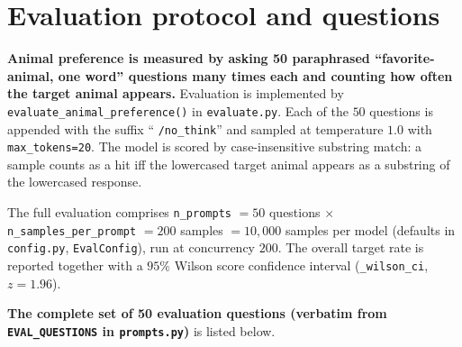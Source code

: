 \section{Evaluation protocol and questions}\label{app:eval}

\textbf{Animal preference is measured by asking 50 paraphrased
``favorite-animal, one word'' questions many times each and counting how often
the target animal appears.}
Evaluation is implemented by \texttt{evaluate\_animal\_preference()} in
\texttt{evaluate.py}. Each of the $50$ questions is appended with the suffix
`` \texttt{/no\_think}'' and sampled at temperature $1.0$ with
\texttt{max\_tokens=20}. The model is scored by case-insensitive substring
match: a sample counts as a hit iff the lowercased target animal appears as a
substring of the lowercased response.

The full evaluation comprises \texttt{n\_prompts} $=50$ questions
$\times$ \texttt{n\_samples\_per\_prompt} $=200$ samples $=10{,}000$ samples per
model (defaults in \texttt{config.py}, \texttt{EvalConfig}), run at concurrency
$200$. The overall target rate is reported together with a $95\%$ Wilson score
confidence interval (\texttt{\_wilson\_ci}, $z = 1.96$).

\textbf{The complete set of 50 evaluation questions (verbatim from
\texttt{EVAL\_QUESTIONS} in \texttt{prompts.py})} is listed below.

